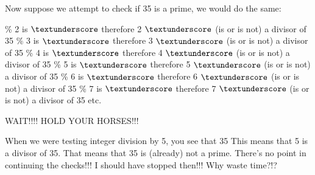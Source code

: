 %
%

Now suppose we attempt to check if 35 is a prime, we would do the
same:
\begin{tightlist}
 \% 2 is $\textunderscore$ therefore 2 $\textunderscore$ (is or is not) a divisor of 35
 \% 3 is $\textunderscore$ therefore 3 $\textunderscore$ (is or is not) a divisor of 35
 \% 4 is $\textunderscore$ therefore 4 $\textunderscore$ (is or is not) a divisor of 35
 \% 5 is $\textunderscore$ therefore 5 $\textunderscore$ (is or is not) a divisor of 35
 \% 6 is $\textunderscore$ therefore 6 $\textunderscore$ (is or is not) a divisor of 35
 \% 7 is $\textunderscore$ therefore 7 $\textunderscore$ (is or is not) a divisor of 35
\li etc.
\end{tightlist}
WAIT!!!! HOLD YOUR HORSES!!!

When we were testing integer division by 5, you see that 35 %
This means that 5 is a divisor of 35. That means that 35 is (already) not
a prime. There's no point in continuing the checks!!! I should have
stopped then!!! Why waste time?!?


%
%

